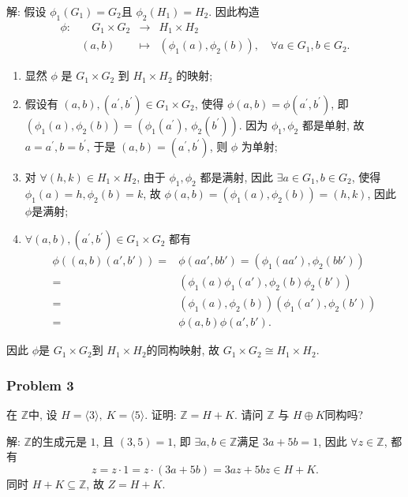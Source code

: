 \documentclass[a4paper,12pt]{ctexart}
\newcommand{\Z}{\mathbb{Z}}
\begin{document}
    解: 假设 $ \phi_1(G_1)=G_2 $且 $ \phi_2(H_1)=H_2 $. 因此构造
    \[\begin{array}{crcl}
      \phi: &\quad G_1 \times G_2 &\longrightarrow & H_1 \times H_2\\
      &(a, b) &\longmapsto&\left(\phi_1(a), \phi_2(b)\right), \quad \forall a \in G_1, b \in G_2 .
    \end{array}\]
    \begin{enumerate}[label=(\arabic{*})]
      \item 显然 $\phi$ 是 $G_1 \times G_2$ 到 $H_1 \times H_2$ 的映射;
      \item 假设有 $(a, b),\left(a^{\prime}, b^{\prime}\right) \in G_1 \times G_2$, 
      使得 $ \phi(a, b)=\phi\left(a^{\prime}, b^{\prime}\right)$, 
      即 $\left(\phi_1(a), \phi_2(b)\right)=\left(\phi_1\left(a^{\prime}\right)\right.$, $\left.\phi_2\left(b^{\prime}\right)\right)$. 
      因为 $\phi_1, \phi_2$ 都是单射, 故 $ a=a^{\prime}, b=b^{\prime}$, 于是 $(a, b)=\left(a^{\prime}, b^{\prime}\right)$, 则 $\phi$ 为单射;
      \item 对 $ \forall (h, k) \in H_1 \times H_2 $, 由于 $ \phi_1, \phi_2 $ 都是满射, 因此 $\exists a \in G_1, b \in G_2$, 
      使得 $ \phi_1(a)=h, \phi_2(b)=k $, 故 $ \phi(a, b)=\left(\phi_1(a), \phi_2(b)\right)=(h, k) $, 因此 $ \phi $是满射;
      \item $ \forall (a, b),\left(a^{\prime}, b^{\prime}\right) \in G_1 \times G_2 $ 都有
      \begin{align*}
        \phi((a,b)(a',b'))=&\phi(aa',bb')=(\phi_1(aa'),\phi_2(bb'))\\
                          =&(\phi_1(a)\phi_1(a'),\phi_2(b)\phi_2(b'))\\
                          =&(\phi_1(a),\phi_2(b))(\phi_1(a'),\phi_2(b'))\\
                          =&\phi(a,b)\phi(a',b').
      \end{align*}
    \end{enumerate}
    因此 $ \phi $是 $ G_1\times G_2 $到 $ H_1\times H_2 $的同构映射, 故 $ G_1\times G_2\cong H_1\times H_2 $.

    \subsubsection*{Problem 3}
    在 $ \Z $中, 设 $ H=\langle 3\rangle,~ K=\langle 5\rangle $. 证明: $ \Z=H+K $. 请问 $ \Z $ 与 $ H\oplus K $同构吗?

    解: $ \Z $的生成元是 $ 1 $, 且 $ (3,5)=1 $, 即 $ \exists a,b\in\Z $满足 $ 3a+5b=1 $, 因此 $ \forall z\in\Z $, 都有
    \[z=z\cdot 1=z\cdot(3a+5b)=3az+5bz\in H+K.\]
    同时 $ H+K\subseteq\Z $, 故 $ Z=H+K $.
\end{document}

